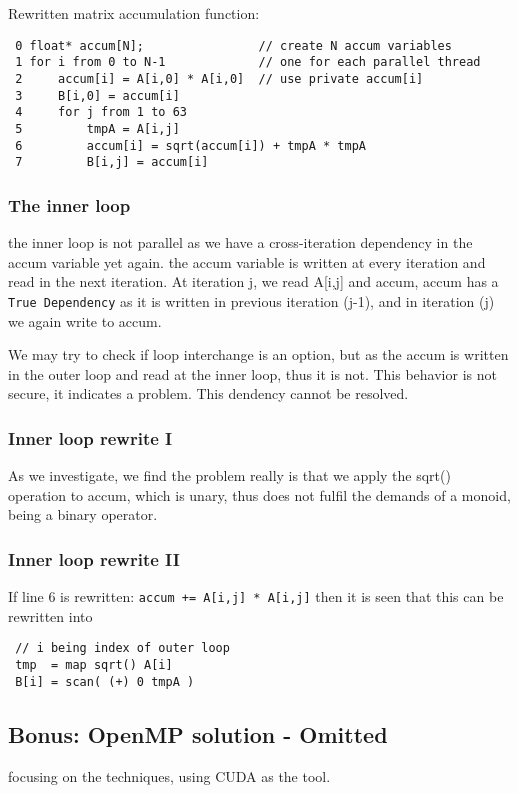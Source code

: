 \documentclass[a4paper,10pt]{article}
\begin{document}
Rewritten matrix accumulation function:
\begin{verbatim}
 0 float* accum[N];                // create N accum variables
 1 for i from 0 to N-1             // one for each parallel thread
 2     accum[i] = A[i,0] * A[i,0]  // use private accum[i]
 3     B[i,0] = accum[i]           
 4     for j from 1 to 63
 5         tmpA = A[i,j]
 6         accum[i] = sqrt(accum[i]) + tmpA * tmpA
 7         B[i,j] = accum[i]
\end{verbatim}


\subsubsection{The inner loop}
the inner loop is not parallel as we have a cross-iteration dependency in the accum variable yet again.
the accum variable is written at every iteration and read in the next iteration.
At iteration j, we read A[i,j] and accum, accum has a \texttt{True Dependency} as it is written in previous iteration (j-1), and in iteration (j) we again write to accum.

We may try to check if loop interchange is an option, but as the accum is written in the outer loop and read at the inner loop, thus it is not.
This behavior is not secure, it indicates a problem. 
This dendency cannot be resolved.

\subsubsection{Inner loop rewrite I}
As we investigate, we find the problem really is that we apply the sqrt() operation to accum, which is unary, thus does not fulfil the demands of a monoid, being a binary operator.

\subsubsection{Inner loop rewrite II}
If line 6 is rewritten:   \texttt{accum += A[i,j] * A[i,j]} then it is seen that this can be rewritten into 
\begin{verbatim}
 // i being index of outer loop
 tmp  = map sqrt() A[i]
 B[i] = scan( (+) 0 tmpA )
\end{verbatim}

 
\vfill

\subsection{Bonus: OpenMP solution - Omitted}
focusing on the techniques, using CUDA as the tool.
\end{document}
